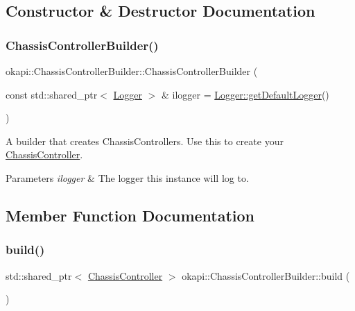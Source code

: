 \subsection{Constructor \& Destructor Documentation}
\mbox{\label{classokapi_1_1ChassisControllerBuilder_a47e82afd7b6f3e3076d153e6130820ed}} 
\subsubsection{\texorpdfstring{ChassisControllerBuilder()}{ChassisControllerBuilder()}}
{\footnotesize\ttfamily okapi\+::\+Chassis\+Controller\+Builder\+::\+Chassis\+Controller\+Builder (\begin{DoxyParamCaption}\item[{const std\+::shared\+\_\+ptr$<$ \mbox{\hyperlink{classokapi_1_1Logger}{Logger}} $>$ \&}]{ilogger = {\ttfamily \mbox{\hyperlink{classokapi_1_1Logger_a5053cf778b4b55acba788a3797dc96d2}{Logger\+::get\+Default\+Logger}}()} }\end{DoxyParamCaption})\hspace{0.3cm}{\ttfamily [explicit]}}

A builder that creates Chassis\+Controllers. Use this to create your \mbox{\hyperlink{classokapi_1_1ChassisController}{Chassis\+Controller}}.


\begin{DoxyParams}{Parameters}
{\em ilogger} & The logger this instance will log to. \\
\hline
\end{DoxyParams}


\subsection{Member Function Documentation}
\mbox{\label{classokapi_1_1ChassisControllerBuilder_a5dfd1f4d60a3c4bfcc28a57211c1a6a2}} 
\subsubsection{\texorpdfstring{build()}{build()}}
{\footnotesize\ttfamily std\+::shared\+\_\+ptr$<$ \mbox{\hyperlink{classokapi_1_1ChassisController}{Chassis\+Controller}} $>$ okapi\+::\+Chassis\+Controller\+Builder\+::build (\begin{DoxyParamCaption}{ }\end{DoxyParamCaption})}

